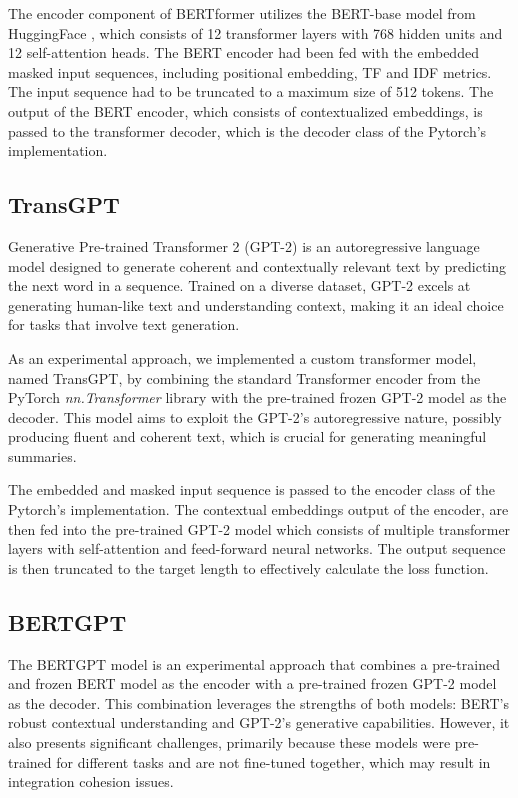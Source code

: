 \documentclass[a4paper, 11pt]{article}
\begin{document}
The encoder component of BERTformer utilizes the BERT-base model from HuggingFace \cite{BERTHugginFace}, which consists of 12 transformer layers with 768 hidden units and 12 self-attention heads. The BERT encoder had been fed with the embedded masked input sequences, including positional embedding, TF and IDF metrics. The input sequence had to be truncated to a maximum size of 512 tokens. The output of the BERT encoder, which consists of contextualized embeddings, is passed to the transformer decoder, which is the decoder class of the Pytorch's implementation.

\subsection{TransGPT}
Generative Pre-trained Transformer 2 (GPT-2) \cite{radford2019language} is an autoregressive language model designed to generate coherent and contextually relevant text by predicting the next word in a sequence. Trained on a diverse dataset, GPT-2 excels at generating human-like text and understanding context, making it an ideal choice for tasks that involve text generation.

As an experimental approach, we implemented a custom transformer model, named TransGPT, by combining the standard Transformer encoder from the PyTorch \textit{nn.Transformer} library with the pre-trained frozen GPT-2 model as the decoder. This model aims to exploit the GPT-2's autoregressive nature, possibly producing fluent and coherent text, which is crucial for generating meaningful summaries.

The embedded and masked input sequence is passed to the encoder class of the Pytorch's implementation. The contextual embeddings output of the encoder, are then fed into the pre-trained GPT-2 model which consists of multiple transformer layers with self-attention and feed-forward neural networks. The output sequence is then truncated to the target length to effectively calculate the loss function.

\subsection{BERTGPT}
The BERTGPT model is an experimental approach that combines a pre-trained and frozen BERT model as the encoder with a pre-trained frozen GPT-2 model as the decoder. This combination leverages the strengths of both models: BERT's robust contextual understanding and GPT-2's generative capabilities. However, it also presents significant challenges, primarily because these models were pre-trained for different tasks and are not fine-tuned together, which may result in integration cohesion issues.
\end{document}
